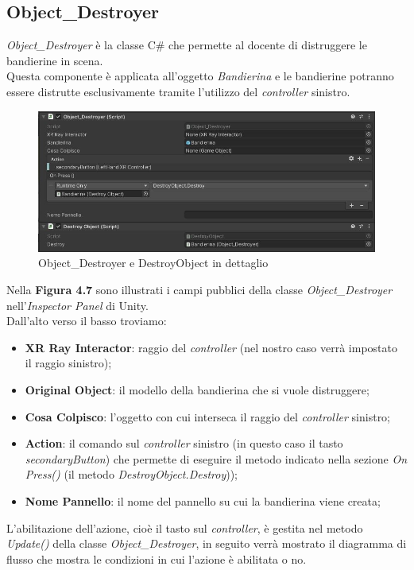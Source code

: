 \subsection{Object\_Destroyer}
\textit{Object\_Destroyer} è la classe C\# che permette al docente di distruggere le bandierine in scena.\\Questa componente è applicata all'oggetto \textit{Bandierina} e le bandierine potranno essere distrutte esclusivamente tramite l'utilizzo del \textit{controller} sinistro.
\begin{figure}[H]
    \centering
    \includegraphics[scale = 0.7]{Immagini/Object_destoryer.jpg}
    \caption{Object\_Destroyer e DestroyObject in dettaglio}
    \label{fig:my_label}
\end{figure}
\hspace{-0.6cm}Nella \textbf{Figura 4.7} sono illustrati i campi pubblici della classe \textit{Object\_Destroyer} nell'\textit{Inspector Panel} di Unity.
\\Dall'alto verso il basso troviamo:
\begin{itemize}
    \item \textbf{XR Ray Interactor}: raggio del \textit{controller} (nel nostro caso verrà impostato il raggio sinistro);
    \item \textbf{Original Object}: il modello della bandierina che si vuole distruggere;
    \item \textbf{Cosa Colpisco}: l'oggetto con cui interseca il raggio del \textit{controller} sinistro;
    \item \textbf{Action}: il comando sul \textit{controller} sinistro (in questo caso il tasto \textit{secondaryButton}) che permette di eseguire il metodo indicato nella sezione \textit{On Press()} (il metodo \textit{DestroyObject.Destroy}));
    \item \textbf{Nome Pannello}: il nome del pannello su cui la bandierina viene creata;
\end{itemize}
L'abilitazione dell'azione, cioè il tasto sul \textit{controller}, è gestita nel metodo \textit{Update()} della classe \textit{Object\_Destroyer}, in seguito verrà mostrato il diagramma di flusso che mostra le condizioni in cui l'azione è abilitata o no.
